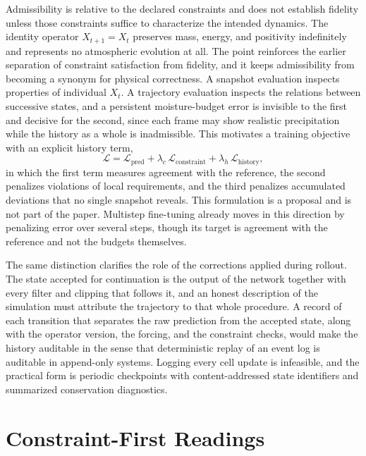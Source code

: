 \documentclass[11pt]{article}
\theoremstyle{definition}
\theoremstyle{remark}
\begin{document}
Admissibility is relative to the declared constraints and does not establish fidelity unless those constraints suffice to characterize the intended dynamics. The identity operator $X_{t+1}=X_t$ preserves mass, energy, and positivity indefinitely and represents no atmospheric evolution at all. The point reinforces the earlier separation of constraint satisfaction from fidelity, and it keeps admissibility from becoming a synonym for physical correctness. A snapshot evaluation inspects properties of individual $X_t$. A trajectory evaluation inspects the relations between successive states, and a persistent moisture-budget error is invisible to the first and decisive for the second, since each frame may show realistic precipitation while the history as a whole is inadmissible. This motivates a training objective with an explicit history term,
\begin{equation}
\mathcal L = \mathcal L_{\mathrm{pred}} + \lambda_c\, \mathcal L_{\mathrm{constraint}} + \lambda_h\, \mathcal L_{\mathrm{history}},
\end{equation}
in which the first term measures agreement with the reference, the second penalizes violations of local requirements, and the third penalizes accumulated deviations that no single snapshot reveals. This formulation is a proposal and is not part of the paper. Multistep fine-tuning already moves in this direction by penalizing error over several steps, though its target is agreement with the reference and not the budgets themselves.

The same distinction clarifies the role of the corrections applied during rollout. The state accepted for continuation is the output of the network together with every filter and clipping that follows it, and an honest description of the simulation must attribute the trajectory to that whole procedure. A record of each transition that separates the raw prediction from the accepted state, along with the operator version, the forcing, and the constraint checks, would make the history auditable in the sense that deterministic replay of an event log is auditable in append-only systems. Logging every cell update is infeasible, and the practical form is periodic checkpoints with content-addressed state identifiers and summarized conservation diagnostics.

\section{Constraint-First Readings}
\end{document}
